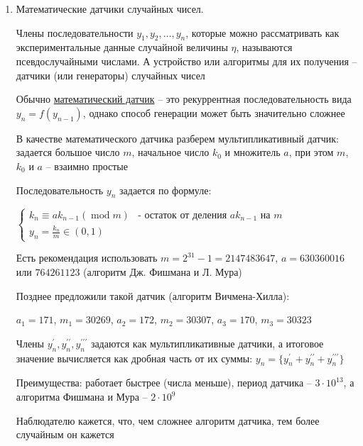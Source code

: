 \begin{enumerate}
    \Nota Если из теории мы знаем вид зависимости и подбираем ее под данные, то желательно строить модель как можно проще

    \Notas Из построенных моделей предпочтительней та, где коэффициент детерминации больше

    \item Математические датчики случайных чисел.

    \Def Члены последовательности $y_1, y_2, \dots, y_n$, которые можно рассматривать как экспериментальные данные случайной величины $\eta$, называются псевдослучайными числами. А устройство или алгоритмы для их получения -- датчики (или генераторы) случайных чисел

    Обычно \hyperlink{mathematical_rng}{математический датчик} -- это рекуррентная последовательность вида $y_n = f(y_{n - 1})$, однако способ генерации может быть значительно сложнее

    В качестве математического датчика разберем мультипликативный датчик: задается большое число $m$, начальное число $k_0$ и множитель $a$, при этом $m$, $k_0$ и $a$ -- взаимно простые

    Последовательность $y_n$ задается по формуле:

    $\begin{cases}
        k_n \equiv a k_{n - 1} (\operatorname{mod} m) & \text{- остаток от деления }ak_{n - 1}\text{ на }m \\
        y_n = \frac{k_n}{m} \in (0, 1)
    \end{cases}$

    Есть рекомендация использовать $m = 2^{31} - 1 = 2147483647$, $a = 630360016$ или $764261123$ (алгоритм Дж. Фишмана и Л. Мура)

    Позднее предложили такой датчик (алгоритм Вичмена-Хилла):

    $a_1 = 171$, $m_1 = 30269$, $a_2 = 172$, $m_2 = 30307$, $a_3 = 170$, $m_3 = 30323$ 

    Члены $y_n^\prime, y_n^{\prime\prime}, y_n^{\prime\prime\prime}$ задаются как мультипликативные датчики, а итоговое значение вычисляется как дробная часть от их суммы: $y_n = \{y_n^\prime + y_n^{\prime\prime} + y_n^{\prime\prime\prime}\}$

    Преимущества: работает быстрее (числа меньше), период датчика -- $3 \cdot 10^{13}$, а алгоритма Фишмана и Мура -- $2 \cdot 10^9$

    Наблюдателю кажется, что, чем сложнее алгоритм датчика, тем более случайным он кажется


\end{enumerate}
